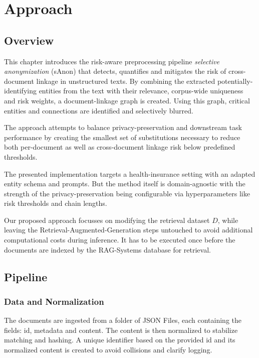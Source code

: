\chapter{Approach}\label{chapter:approach}

\section{Overview}
This chapter introduces the risk-aware preprocessing pipeline \textit{selective anonymization} (sAnon) that detects, quantifies and mitigates the risk of cross-document linkage in unstructured texts. By combining the extracted potentially-identifying entities from the text with their relevance, corpus-wide uniqueness and risk weights, a document-linkage graph is created. Using this graph, critical entities and connections are identified and selectively blurred.

The approach attempts to balance privacy-preservation and downstream task performance by creating the smallest set of substitutions necessary to reduce both per-document as well as cross-document linkage risk below predefined thresholds. 

The presented implementation targets a health-insurance setting with an adapted entity schema and prompts. But the method itself is domain-agnostic with the strength of the privacy-preservation being configurable via hyperparameters like risk thresholds and chain lengths.

Our proposed approach focusses on modifying the retrieval dataset $D$, while leaving the Retrieval-Augmented-Generation steps untouched to avoid additional computational costs during inference. It has to be executed once before the documents are indexed by the \ac{RAG}-Systems database for retrieval.

\section{Pipeline}
\subsection{Data and Normalization}
The documents are ingested from a folder of JSON Files, each containing the fields: id, metadata and content. The content is then normalized to stabilize matching and hashing. A unique identifier based on the provided id and its normalized content is created to avoid collisions and clarify logging.

